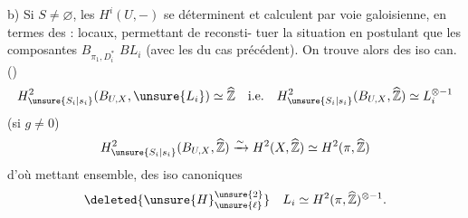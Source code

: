 b) Si $S\ne\varnothing$, les $H^i(U,-)$ se déterminent
et calculent par voie galoisienne, en termes
des   : locaux, permettant de reconsti-
tuer la situation
en postulant que les composantes $B_{\pi_1,D_i^{*}}$
 $BL_i$ (avec les
 du cas précédent). On
trouve alors des iso can. ()
\[
H^2_{\unsure{S_i|s_i}}(B_{U,X},\unsure{L_i})\simeq\widehat{\mathbb Z}
\quad\text{i.e.}\quad
H^2_{\unsure{S_i|s_i}}(B_{U,X},\widehat{\mathbb Z})\simeq L_i^{\otimes-1}
\]
(si $g\ne0$)
\[
H^2_{\unsure{S_i|s_i}}(B_{U,X},\widehat{\mathbb Z})
\xrightarrow{\sim}H^2(X,\widehat{\mathbb Z})
\simeq H^2(\pi,\widehat{\mathbb Z})
\]
d'où   mettant ensemble, des iso
canoniques
\[
\deleted{\unsure{H}^{\unsure{2}}_{\unsure{\ell}}}\quad L_i\simeq H^2(\pi,\widehat{\mathbb Z})^{\otimes-1}.
\]
